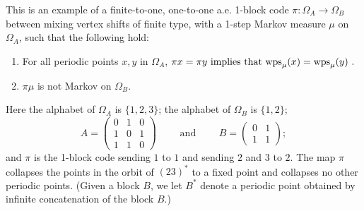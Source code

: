 \documentclass{kepart2010}
\theoremstyle{plain}
\theoremstyle{definition}
\theoremstyle{remark}
\theoremstyle{definition}
\numberwithin{equation}{section}
\begin{document}
\begin{ex}
This is an example of a finite-to-one, one-to-one a.e. 1-block code
$\pi : \Omega_A \to \Omega_B$ between mixing vertex shifts of finite
type, with a 1-step Markov measure $\mu$ on $\Omega_A$,  such that
the following hold:
\begin{enumerate}
\item
For all periodic points $x,y$ in $\Omega_A$, $ \pi x = \pi y \text{
implies that } \textnormal{wps}_{\mu}(x) = \textnormal{wps}_{\mu}(y)
\ . $
\item
$\pi \mu $ is not Markov on $\Omega_B$.
\end{enumerate}
Here the alphabet of $\Omega_A$ is $\{1,2,3\}$; the alphabet of
$\Omega_B$ is $\{1,2\}$;
 \begin{equation*}
 A= \begin{pmatrix}
    0 & 1 & 0\\
    1 & 0 & 1\\
    1 & 1 & 0
    \end{pmatrix}
\qquad\text{ and }\qquad B=
\begin{pmatrix}
    0 & 1 \\
    1 & 1
    \end{pmatrix};
    \end{equation*}
and $\pi$ is the 1-block code sending $1$ to $1$ and sending $2$ and
$3$ to $2$. The map $\pi$ collapses the points in the orbit of
$(23)^*$ to a fixed point and collapses no other periodic points.
(Given a block $B$, we let $B^*$ denote a periodic point obtained by
infinite concatenation of the block $B$.)


\end{ex}
\end{document}
